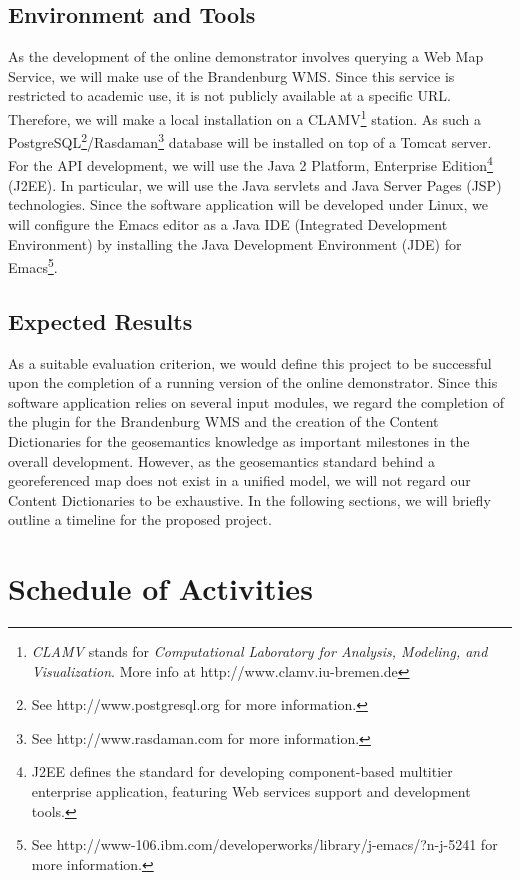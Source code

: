 \documentclass[a4paper,11pt,openany,notitlepage]{article}
\begin{document}
\subsection{Environment and Tools} \label{subsec:tools}
\indent

As the development of the online demonstrator involves querying a Web Map Service, we will make use of the Brandenburg WMS. Since this service is restricted to academic use, it is not publicly available at a specific URL. Therefore, we will make a local installation on a CLAMV\footnote{\textit{CLAMV} stands for \textit{Computational Laboratory for Analysis, Modeling, and Visualization}. More info at http://www.clamv.iu-bremen.de} station. As such a PostgreSQL\footnote{See http://www.postgresql.org for more information.}/Rasdaman\footnote{See http://www.rasdaman.com for more information.} database will be installed on top of a Tomcat server. For the API development, we will use the Java 2 Platform, Enterprise Edition\footnote{J2EE defines the standard for developing component-based multitier enterprise application, featuring Web services support and development tools.} (J2EE). In particular, we will use the Java servlets and Java Server Pages (JSP) technologies. Since the software application will be developed under Linux, we will configure the Emacs editor as a Java IDE (Integrated Development Environment) by installing the Java Development Environment (JDE) for Emacs\footnote{See http://www-106.ibm.com/developerworks/library/j-emacs/?n-j-5241 for more information.}.

\subsection{Expected Results} \label{subsec:results}
\indent

As a suitable evaluation criterion, we would define this project to be successful upon the completion of a running version of the online demonstrator. Since this software application relies on several input modules, we regard the completion of the plugin for the Brandenburg WMS and the creation of the Content Dictionaries for the geosemantics knowledge as important milestones in the overall development. However, as the geosemantics standard behind a georeferenced map does not exist in a unified model, we will not regard our Content Dictionaries to be exhaustive. In the following sections, we will briefly outline a timeline for the proposed project.

%
\section{Schedule of Activities} \label{sec:schedule}
\indent
\end{document}
